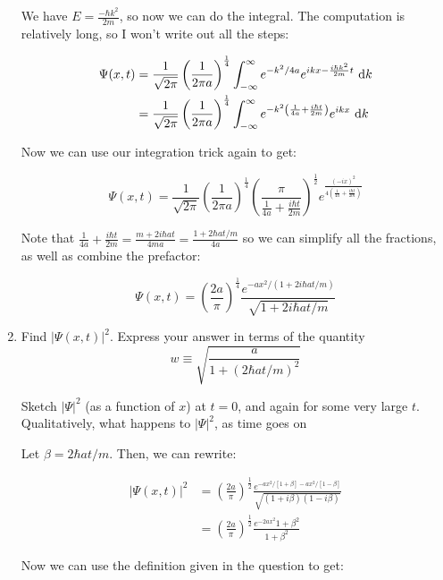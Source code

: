 \documentclass{article}
\begin{document}
\begin{enumerate}[label=(\alph*)]
\begin{solution}
        We have $E = \frac{-\hbar k^2}{2m}$, so now we can do the integral. The computation is relatively long, so I won't write out all the steps:

        \begin{align*}
            \Psi(x, t) &= \frac{1}{\sqrt{2\pi}} \left(\frac{1}{2\pi a}\right)^{\frac{1}{4}} \int_{-\infty}^{\infty} e^{-k^2/4a} e^{ikx - \frac{i\hbar k^2}{2m}t} \ \mathrm d k\\
            &= \frac{1}{\sqrt{2\pi}} \left(\frac{1}{2\pi a}\right)^{\frac{1}{4}} \int_{-\infty}^{\infty} e^{-k^2\left(\frac{1}{4a} + \frac{i\hbar t}{2m}\right)} e^{ikx} \ \mathrm d k
        \end{align*}

        Now we can use our integration trick again to get:

        \[ \Psi(x, t) = \frac{1}{\sqrt{2\pi}} \left(\frac{1}{2\pi a}\right)^{\frac{1}{4}} \left(\frac{\pi}{\frac{1}{4a} + \frac{i\hbar t}{2m}}\right)^{\frac{1}{2}} e^{\frac{(-ix)^2}{4\left(\frac{1}{4a} + \frac{i\hbar t}{2m}\right)}}\]

        Note that $\frac{1}{4a} + \frac{i\hbar t}{2m} = \frac{m + 2i\hbar a t}{4ma} = \frac{1 + 2\hbar at/m}{4a}$ so we can simplify all the fractions, as well as combine the prefactor:

        \[ \Psi(x, t) = \left(\frac{2a}{\pi}\right)^{\frac{1}{4}} \frac{e^{-ax^2/(1 + 2i\hbar at/m)}}{\sqrt{1 + 2i\hbar a t/m}}\]


    \end{solution}

    \item Find $|\Psi(x, t)|^2$. Express your answer in terms of the quantity
    \[ w \equiv \sqrt{\frac{a}{1 + (2\hbar a t/m)^2}}\]

    Sketch $|\Psi|^2$ (as a function of $x$) at $t = 0$, and again for some very large $t$. Qualitatively, what happens to $|\Psi|^2$, as time goes on

    \begin{solution}
    Let $\beta = 2\hbar a t/m$. Then, we can rewrite:

        \begin{align*}
            |\Psi(x, t)|^2 &= \left(\frac{2a}{\pi}\right)^\frac{1}{2} \frac{e^{-ax^2/[1+ \beta] - ax^2/[1-\beta]}}{\sqrt{(1 + i\beta)(1 - i\beta)}}\\
            &= \left(\frac{2a}{\pi}\right)^\frac{1}{2} \frac{e^{-2ax^2}{1 + \beta^2}}{1 + \beta^2}
        \end{align*}

        Now we can use the definition given in the question to get:



\end{solution}
\end{enumerate}
\end{document}
